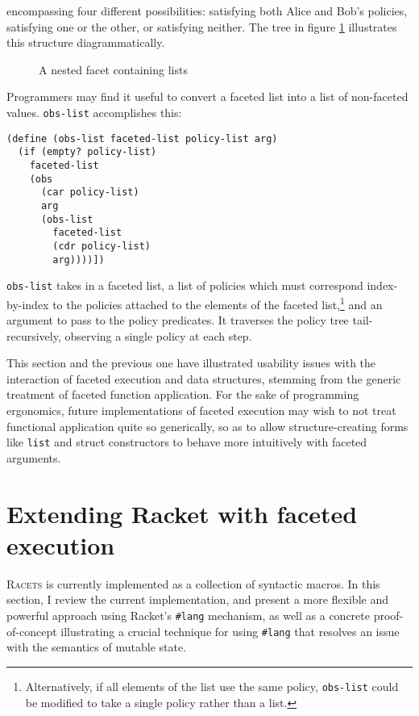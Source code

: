 \documentclass{article}
\begin{document}
\noindent encompassing four different possibilities: satisfying both Alice and Bob's policies, satisfying one or the other, or satisfying neither. The tree in figure \ref{figure:nested-list} illustrates this structure diagrammatically.

\begin{figure}[h]
\begin{center}
	\caption{A nested facet containing lists}
	\label{figure:nested-list}
\end{center}
\end{figure}

Programmers may find it useful to convert a faceted list into a list of non-faceted values. \texttt{obs-list} accomplishes this:

\begin{lstlisting}
(define (obs-list faceted-list policy-list arg)
  (if (empty? policy-list)
    faceted-list
    (obs
      (car policy-list)
      arg
      (obs-list
        faceted-list
        (cdr policy-list)
        arg))))])
\end{lstlisting}

\texttt{obs-list} takes in a faceted list, a list of policies which must correspond index-by-index to the policies attached to the elements of the faceted list,\footnote{Alternatively, if all elements of the list use the same policy, \texttt{obs-list} could be modified to take a single policy rather than a list.} and an argument to pass to the policy predicates. It traverses the policy tree tail-recursively, observing a single policy at each step.

This section and the previous one have illustrated usability issues with the interaction of faceted execution and data structures, stemming from the generic treatment of faceted function application. For the sake of programming ergonomics, future implementations of faceted execution may wish to not treat functional application quite so generically, so as to allow structure-creating forms like \texttt{list} and struct constructors to behave more intuitively with faceted arguments.



\section{Extending Racket with faceted execution\label{sec:lang}}
\textsc{Racets} is currently implemented as a collection of syntactic macros. In this section, I review the current implementation, and present a more flexible and powerful approach using Racket's \texttt{\#lang} mechanism, as well as a concrete proof-of-concept illustrating a crucial technique for using \texttt{\#lang} that resolves an issue with the semantics of mutable state.
\end{document}
